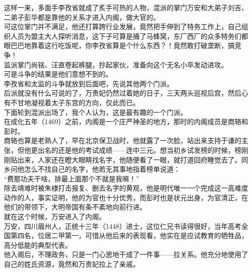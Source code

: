 \begin{multicols}{\theparacolNo}
这样一来，多面手李孜省就成了炙手可热的人物，混派的掌门万安和大弟子刘吉、二弟子彭华都是靠他的关系才进入内阁，做大官的。\\

可这位掌门并不满足，他还打算跨行业发展，竟然把手伸到了特务工作上，自己组织人员为盟主大人探听消息，这下子可算是捅了马蜂窝，东厂西厂的众多特务们都眼巴巴地靠着这行吃饭呢，你李孜省算是个什么东西？！竟然敢打破垄断，搞竞争！\\

监派掌门尚铭、汪直卷起裤腿，抄起家伙，准备向这个无名小卒发动进攻。\\

可是斗争的结果是他们意想不到的。\\

李孜省和太监的斗争就放到后面吧，先说其他两个门派。\\

后派就没有什么可说的了，万贵妃仍然过着她的日子，三天两头巡视后宫，然后心有不甘地凝视着太子东宫的方向，仅此而已。\\

下面轮到混派出场了，我个人认为，这是最有趣的一个门派。\\

在成化五年（1469）之前，内阁是一个庄严神圣的地方，那时的内阁成员是商辂和彭时。\\

商辂也算是老熟人了，早在北京保卫战时，他就露了一次脸，站出来支持于谦的主张，但他更出名的还是他的考试成绩——连中三元。想当初乡试发榜的时候，榜刚刚贴出来，人家还在瞪大眼睛找名字，他随便看了一眼，就打道回府睡觉去了。同乡问他怎么不找自己的名字，他若无其事地指着榜单说道：\\

“费那功夫干啥，排最上面那个不就是我嘛！”\\

除去靖难时被朱棣打击报复、删去名字的黄观，他是明代唯一一个完成这一高难度动作的人，事实证明，他的为官也十分优秀，而彭时也是状元出身，为官清正，在他们的带领下，大明帝国有条不紊地向前行进。\\

就在这个时候，万安进入了内阁。\\

万安，四川眉州人，正统十三年（1448）进士，这位仁兄书读得很好，当年高考全国第四名，位居二甲第一，可惜从他后来的表现看，他实在是应试教育的牺牲品，高分低能的典型代表。\\

他入阁后，不理政务，只是一门心思地干成了一件事——拉关系。他充分地使用了自己的姓氏资源，竟然和万贵妃拉上了亲戚。\\


\end{multicols}
